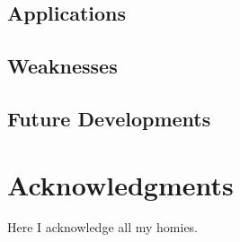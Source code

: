 \documentclass[fleqn,10pt]{olplainarticle}\usepackage[]{graphicx}\usepackage[]{color}
\begin{document}
\subsection{Applications}

\subsection{Weaknesses}

\subsection{Future Developments}


\section*{Acknowledgments}

Here I acknowledge all my homies.


\end{document}
